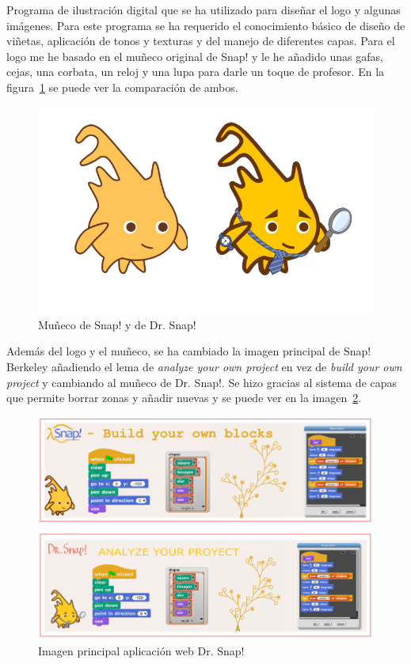 \documentclass[a4paper, 12pt]{book}
\begin{document}
\begin{enumerate}[a)]
    Programa de ilustración digital que se ha utilizado para diseñar el logo y algunas imágenes. Para este programa se ha requerido el conocimiento básico de diseño de viñetas, aplicación de tonos y texturas y del manejo de diferentes capas. Para el logo me he basado en el muñeco original de Snap! y le he añadido unas gafas, cejas, una corbata, un reloj y una lupa para darle un toque de profesor. En la figura~\ref{figura:logos} se puede ver la comparación de ambos. 
    \\
        \begin{figure}[h]
            \centering
            \includegraphics[scale=0.3]{img/logos.png}
            \caption{Muñeco de Snap! y de Dr. Snap!}
            \label{figura:logos}
        \end{figure}
        
    Además del logo y el muñeco, se ha cambiado la imagen principal de Snap! Berkeley añadiendo el lema de \textit{analyze your own project} en vez de \textit{build your own project} y cambiando al muñeco de Dr. Snap!. Se hizo gracias al sistema de capas que permite borrar zonas y añadir nuevas y se puede ver en la imagen~\ref{figura:snap}.
    
    \begin{figure}[h]
            \centering
            \includegraphics[scale=0.35]{img/snap.PNG}
            \caption{Imagen principal aplicación web Dr. Snap!}
            \label{figura:snap}
        \end{figure}
        

\end{enumerate}
\end{document}
